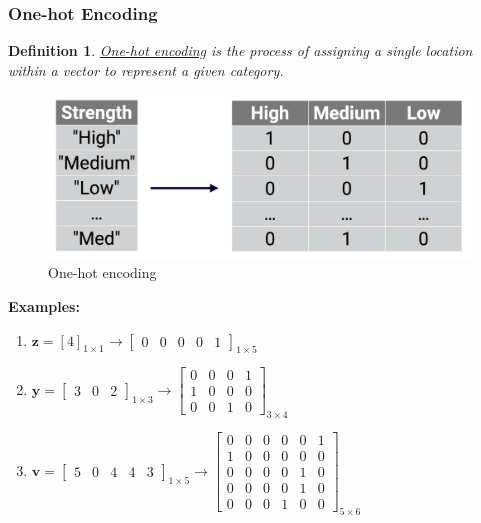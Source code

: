 \documentclass[11pt,a4paper]{article}
\newtheorem{definition}{Definition}
\begin{document}
\subsubsection{One-hot Encoding}
\begin{definition}
    \underline{One-hot encoding} is the process of assigning a single location within a vector to represent a given category.
\end{definition}
\begin{center}\begin{figure}[htbp]
    \centering
    \includegraphics[scale=0.15]{ohe.png}
    \caption{One-hot encoding}
    \label{}
\end{figure}\end{center}
\textbf{Examples:}
\begin{enumerate}
    \item $\mathbf{z}=[4]_{1 \times 1} \rightarrow\left[\begin{array}{lllll}
        0 & 0 & 0 & 0 & 1
        \end{array}\right]_{1 \times 5}$
    \item $\mathbf{y}=\left[\begin{array}{lll}
        3 & 0 & 2
        \end{array}\right]_{1 \times 3} \rightarrow\left[\begin{array}{llll}
        0 & 0 & 0 & 1 \\
        1 & 0 & 0 & 0 \\
        0 & 0 & 1 & 0
        \end{array}\right]_{3 \times 4}$
    \item $\mathbf{v}=\left[\begin{array}{lllll}
        5 & 0 & 4 & 4 & 3
        \end{array}\right]_{1 \times 5} \rightarrow\left[\begin{array}{llllll}
        0 & 0 & 0 & 0 & 0 & 1 \\
        1 & 0 & 0 & 0 & 0 & 0 \\
        0 & 0 & 0 & 0 & 1 & 0 \\
        0 & 0 & 0 & 0 & 1 & 0 \\
        0 & 0 & 0 & 1 & 0 & 0
        \end{array}\right]_{5 \times 6}$
\end{enumerate}
\end{document}
